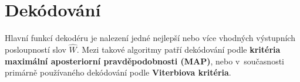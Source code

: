 \section{Dekódování}
\label{chap:asr:decoding}

Hlavní funkcí dekodéru je nalezení jedné nejlepší nebo více vhodných výstupních posloupností slov $\hat{W}$.
Mezi takové algoritmy patří dekódování podle \textbf{kritéria maximální aposteriorní pravděpodobnosti (MAP)}, nebo v~současnosti primárně používaného dekódování podle \textbf{Viterbiova kritéria}.



